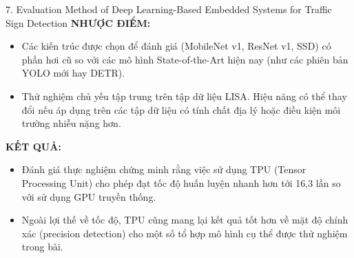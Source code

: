 \documentclass[12pt,a4paper]{article}
\newcommand{\subheading}[1]{\vspace{0.3cm}\noindent\textbf{\textcolor{primary}{\MakeUppercase{#1}:}}\par\vspace{0.1cm}}
\begin{document}
\begin{paperbox}{7. Evaluation Method of Deep Learning-Based Embedded Systems for Traffic Sign Detection}
    \subheading{Nhược điểm}
    \begin{itemize}
        \item Các kiến trúc được chọn để đánh giá (MobileNet v1, ResNet v1, SSD) có phần hơi cũ so với các mô hình State-of-the-Art hiện nay (như các phiên bản YOLO mới hay DETR).
        \item Thử nghiệm chủ yếu tập trung trên tập dữ liệu LISA. Hiệu năng có thể thay đổi nếu áp dụng trên các tập dữ liệu có tính chất địa lý hoặc điều kiện môi trường nhiễu nặng hơn.
    \end{itemize}

    \subheading{Kết quả}
    \begin{itemize}
        \item Đánh giá thực nghiệm chứng minh rằng việc sử dụng TPU (Tensor Processing Unit) cho phép đạt tốc độ huấn luyện nhanh hơn tới 16,3 lần so với sử dụng GPU truyền thống.
        \item Ngoài lợi thế về tốc độ, TPU cũng mang lại kết quả tốt hơn về mặt độ chính xác (precision detection) cho một số tổ hợp mô hình cụ thể được thử nghiệm trong bài.
    \end{itemize}
\end{paperbox}

\vspace{0.5cm}
\end{document}
